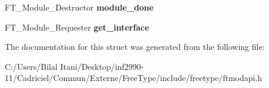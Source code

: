 \begin{DoxyCompactItemize}
\item 
F\+T\+\_\+\+Module\+\_\+\+Destructor {\bfseries module\+\_\+done}\hypertarget{struct_f_t___module___class___ab6e9c780519e24a51144df79692cf339}{}\label{struct_f_t___module___class___ab6e9c780519e24a51144df79692cf339}

\item 
F\+T\+\_\+\+Module\+\_\+\+Requester {\bfseries get\+\_\+interface}\hypertarget{struct_f_t___module___class___aa72d79fcd0991231e24e88f359244e8e}{}\label{struct_f_t___module___class___aa72d79fcd0991231e24e88f359244e8e}

\end{DoxyCompactItemize}


The documentation for this struct was generated from the following file\+:\begin{DoxyCompactItemize}
\item 
C\+:/\+Users/\+Bilal Itani/\+Desktop/inf2990-\/11/\+Cadriciel/\+Commun/\+Externe/\+Free\+Type/include/freetype/ftmodapi.\+h\end{DoxyCompactItemize}
